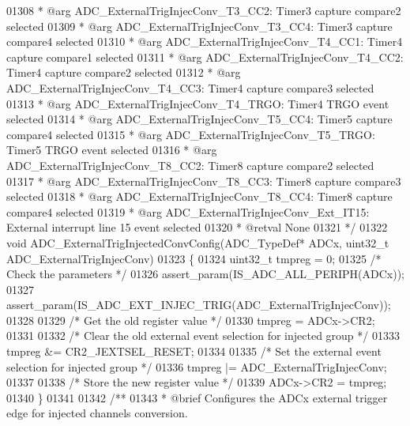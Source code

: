 \begin{DoxyCode}
01308 \textcolor{comment}{  *            @arg ADC\_ExternalTrigInjecConv\_T3\_CC2: Timer3 capture compare2 selected }
01309 \textcolor{comment}{  *            @arg ADC\_ExternalTrigInjecConv\_T3\_CC4: Timer3 capture compare4 selected }
01310 \textcolor{comment}{  *            @arg ADC\_ExternalTrigInjecConv\_T4\_CC1: Timer4 capture compare1 selected                
             }
01311 \textcolor{comment}{  *            @arg ADC\_ExternalTrigInjecConv\_T4\_CC2: Timer4 capture compare2 selected }
01312 \textcolor{comment}{  *            @arg ADC\_ExternalTrigInjecConv\_T4\_CC3: Timer4 capture compare3 selected                
              }
01313 \textcolor{comment}{  *            @arg ADC\_ExternalTrigInjecConv\_T4\_TRGO: Timer4 TRGO event selected }
01314 \textcolor{comment}{  *            @arg ADC\_ExternalTrigInjecConv\_T5\_CC4: Timer5 capture compare4 selected                
              }
01315 \textcolor{comment}{  *            @arg ADC\_ExternalTrigInjecConv\_T5\_TRGO: Timer5 TRGO event selected                     
         }
01316 \textcolor{comment}{  *            @arg ADC\_ExternalTrigInjecConv\_T8\_CC2: Timer8 capture compare2 selected}
01317 \textcolor{comment}{  *            @arg ADC\_ExternalTrigInjecConv\_T8\_CC3: Timer8 capture compare3 selected                
              }
01318 \textcolor{comment}{  *            @arg ADC\_ExternalTrigInjecConv\_T8\_CC4: Timer8 capture compare4 selected }
01319 \textcolor{comment}{  *            @arg ADC\_ExternalTrigInjecConv\_Ext\_IT15: External interrupt line 15 event selected     
                           }
01320 \textcolor{comment}{  * @retval None}
01321 \textcolor{comment}{  */}
01322 \textcolor{keywordtype}{void} ADC_ExternalTrigInjectedConvConfig(ADC\_TypeDef* ADCx, uint32\_t ADC\_ExternalTrigInjecConv)
01323 \{
01324   uint32\_t tmpreg = 0;
01325   \textcolor{comment}{/* Check the parameters */}
01326   assert_param(IS\_ADC\_ALL\_PERIPH(ADCx));
01327   assert_param(IS\_ADC\_EXT\_INJEC\_TRIG(ADC\_ExternalTrigInjecConv));
01328 
01329   \textcolor{comment}{/* Get the old register value */}
01330   tmpreg = ADCx->CR2;
01331 
01332   \textcolor{comment}{/* Clear the old external event selection for injected group */}
01333   tmpreg &= CR2_JEXTSEL_RESET;
01334 
01335   \textcolor{comment}{/* Set the external event selection for injected group */}
01336   tmpreg |= ADC\_ExternalTrigInjecConv;
01337 
01338   \textcolor{comment}{/* Store the new register value */}
01339   ADCx->CR2 = tmpreg;
01340 \}
01341 
01342 \textcolor{comment}{/**}
01343 \textcolor{comment}{  * @brief  Configures the ADCx external trigger edge for injected channels conversion.}

\end{DoxyCode}
